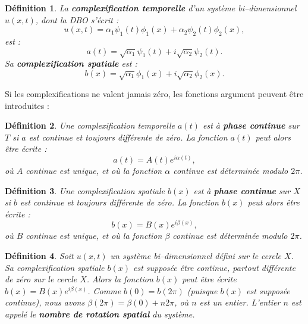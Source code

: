 \documentclass{book}
\newtheorem{defn}{D\'efinition}[chapter]
\begin{document}
\begin{defn}
La   {\bf complexification 
temporelle} d'un syst\`eme
bi--dimensionnel $u(x,t)$, dont la DBO s'\'ecrit :
\begin{equation}
u(x,t)=\alpha_1\psi_1(t)\phi_1(x)+\alpha_2\psi_2(t)\phi_2(x),
\label{bod2d}
\end{equation}
est :
\begin{equation}
a(t)=\sqrt{\alpha_1}\psi_1(t)+i\sqrt{\alpha_2}\psi_2(t).
\end{equation}
Sa {\bf  complexification spatiale}
est : 
\begin{equation}
b(x)=\sqrt{\alpha_1}\phi_1(x)+i\sqrt{\alpha_2}\phi_2(x).
\end{equation}
\end{defn}

Si les complexifications ne valent jamais z\'ero, les fonctions argument 
peuvent \^etre introduites :


\begin{defn}
Une complexification temporelle $a(t)$ est \`a {\bf phase
continue}
sur $T$
si $a$ est continue et toujours diff\'erente de z\'ero.
La fonction $a(t)$  peut alors \^etre \'ecrite :
\begin{equation}
a(t)=A(t)e^{i\alpha(t)},
\end{equation}
o\`u $A$ continue est unique, et o\`u la fonction $\alpha$ continue
est d\'etermin\'ee modulo  $2\pi$.
\end{defn}

\begin{defn}
Une complexification spatiale $b(x)$ est \`a {\bf phase continue} 
sur $X$
si $b$ est continue et toujours diff\'erente de z\'ero.
La fonction $b(x)$  peut alors \^etre \'ecrite :
\begin{equation}
b(x)=B(x)e^{i\beta(x)},
\end{equation}
o\`u $B$ continue est unique, et o\`u la fonction $\beta$ continue
est d\'etermin\'ee modulo $2\pi$.
\end{defn}





\begin{defn}
Soit $u(x,t)$ un syst\`eme bi--dimensionnel d\'efini sur le cercle $X$.
Sa complexification spatiale $b(x)$ est suppos\'ee \^etre
continue, partout diff\'erente de z\'ero sur le cercle $X$. 
Alors la fonction $b(x)$ peut \^etre \'ecrite
$b(x)=B(x)e^{i\beta(x)}$. 
Comme $b(0)=b(2\pi)$ (puisque $b(x)$ est suppos\'ee continue), nous avons
$\beta(2\pi)=\beta(0)+n2\pi$, o\`u $n$ 
est un 
entier. L'entier $n$ est appel\'e le {\bf nombre de
rotation spatial} du
syst\`eme.  
\end{defn}
\end{document}
